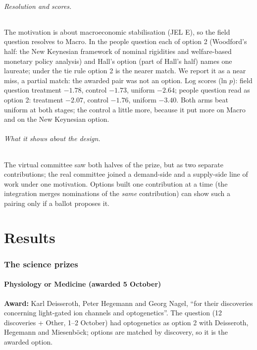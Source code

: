 \documentclass[11pt,a4paper]{article}
\begin{document}
\paragraph{Resolution and scores.} The motivation is about macroeconomic stabilisation (JEL E), so the field question
resolves to Macro. In the people question each of option 2 (Woodford's half: the New Keynesian
framework of nominal rigidities and welfare-based monetary policy analysis) and Hall's option (part of Hall's half)
names one laureate; under the tie rule option 2 is the nearer match. We report it as a near miss, a partial match:
the awarded pair was not an option. Log scores (ln $p$): field question treatment $-1.78$, control $-1.73$, uniform
$-2.64$; people question read as option 2: treatment $-2.07$, control $-1.76$, uniform $-3.40$. Both arms beat uniform at
both stages; the control a little more, because it put more on Macro and on the New Keynesian option.

\paragraph{What it shows about the design.} The virtual committee saw both halves of the prize, but as two separate
contributions; the real committee joined a demand-side and a supply-side line of work under one motivation. Options
built one contribution at a time (the integration merges nominations of the \emph{same} contribution) can show such a
pairing only if a ballot proposes it.
\part{Results}\label{part:results}

\section{The science prizes}\label{sec:res-science}

\subsection{Physiology or Medicine (awarded 5 October)}

\textbf{Award:} Karl Deisseroth, Peter Hegemann and Georg Nagel, ``for their discoveries concerning light-gated ion
channels and optogenetics''. The question (12 discoveries + Other, 1--2 October) had optogenetics as option 2 with
Deisseroth, Hegemann and Miesenböck; options are matched by discovery, so it is the awarded option.
\end{document}
